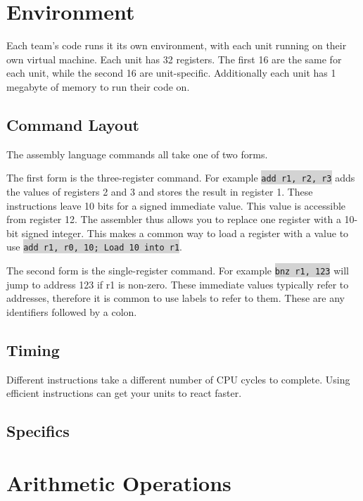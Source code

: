 \documentclass{article}
\newcommand{\vnscode}[1]{\colorbox{lightgray}{\lstinline[language=vns]{#1}}}
\begin{document}

\section{Environment}

Each team's code runs it its own environment, with each unit running on their
own virtual machine. Each unit has 32 registers. The first 16 are the same for
each unit, while the second 16 are unit-specific. Additionally each unit has 1
megabyte of memory to run their code on.

\subsection{Command Layout}

The assembly language commands all take one of two forms.

The first form is the three-register command. For example \vnscode{add r1, r2,
r3} adds the values of registers 2 and 3 and stores the result in register 1.
These instructions leave 10 bits for a signed immediate value. This value is
accessible from register 12.  The assembler thus allows you to replace one
register with a 10-bit signed integer. This makes a common way to load a
register with a value to use \vnscode{add r1, r0, 10; Load 10 into r1}.

The second form is the single-register command. For example \vnscode{bnz r1,
123} will jump to address 123 if r1 is non-zero. These immediate values
typically refer to addresses, therefore it is common to use labels to refer to
them. These are any identifiers followed by a colon.

\subsection{Timing}

Different instructions take a different number of CPU cycles to complete. Using
efficient instructions can get your units to react faster.

\subsection{Specifics}


\section{Arithmetic Operations}
\end{document}
